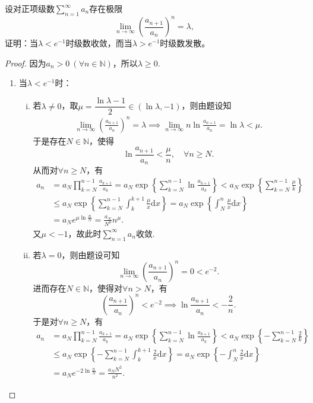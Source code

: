 \documentclass[../../main.tex]{subfiles}%
\begin{document}
\begin{example}[Frink判别法]

设对正项级数$\sum\limits_{n=1}^{\infty} a_n$存在极限
$$\lim_{n\to\infty} \left( \frac{a_{n+1}}{a_n} \right)^n = \lambda,$$
证明：当$\lambda < e^{-1}$时级数收敛，而当$\lambda > e^{-1}$时级数发散。
\end{example}
\begin{proof}
因为$a_n>0\ (\forall n\in\mathbb{N})$，所以$\lambda\geqslant 0$.

\begin{enumerate}[(1)]
\item 当$\lambda < e^{-1}$时：
\begin{enumerate}[(i)]
\item 若$\lambda \ne 0$，取$\mu = \dfrac{\ln\lambda - 1}{2} \in (\ln\lambda, -1)$，则由题设知
\begin{align*}
\lim_{n\to\infty} \left( \frac{a_{n+1}}{a_n} \right)^n = \lambda \implies \lim_{n\to\infty} n\ln\frac{a_{n+1}}{a_n} = \ln\lambda < \mu.
\end{align*}
于是存在$N\in\mathbb{N}$，使得
$$\ln\frac{a_{n+1}}{a_n} < \frac{\mu}{n}, \quad \forall n\geqslant N.$$
从而对$\forall n\geqslant N$，有
\begin{align*}
a_n &= a_N \prod_{k=N}^{n-1} \frac{a_{k+1}}{a_k} = a_N \exp\left\{ \sum_{k=N}^{n-1} \ln\frac{a_{k+1}}{a_k} \right\} < a_N \exp\left\{ \sum_{k=N}^{n-1} \frac{\mu}{k} \right\} \\
&\leqslant a_N \exp\left\{ \sum_{k=N}^{n-1} \int_k^{k+1} \frac{\mu}{x} \mathrm{d}x \right\} = a_N \exp\left\{ \int_N^n \frac{\mu}{x} \mathrm{d}x \right\} \\
&= a_N e^{\mu\ln\frac{n}{N}} = \frac{a_N}{N^\mu} n^\mu.
\end{align*}
又$\mu < -1$，故此时$\sum\limits_{n=1}^{\infty} a_n$收敛.

\item 若$\lambda = 0$，则由题设可知
$$\lim_{n\to\infty} \left( \frac{a_{n+1}}{a_n} \right)^n = 0 < e^{-2}.$$
进而存在$N\in\mathbb{N}$，使得对$\forall n>N$，有
$$\left( \frac{a_{n+1}}{a_n} \right)^n < e^{-2} \implies \ln\frac{a_{n+1}}{a_n} < -\frac{2}{n}.$$
于是对$\forall n\geqslant N$，有
\begin{align*}
a_n &= a_N \prod_{k=N}^{n-1} \frac{a_{k+1}}{a_k} = a_N \exp\left\{ \sum_{k=N}^{n-1} \ln\frac{a_{k+1}}{a_k} \right\} < a_N \exp\left\{ -\sum_{k=N}^{n-1} \frac{2}{k} \right\} \\
&\leqslant a_N \exp\left\{ -\sum_{k=N}^{n-1} \int_k^{k+1} \frac{2}{x} \mathrm{d}x \right\} = a_N \exp\left\{ -\int_N^n \frac{2}{x} \mathrm{d}x \right\} \\
&= a_N e^{-2\ln\frac{n}{N}} = \frac{a_N N^2}{n^2}.
\end{align*}
\end{enumerate}


\end{enumerate}
\end{proof}
\end{document}
